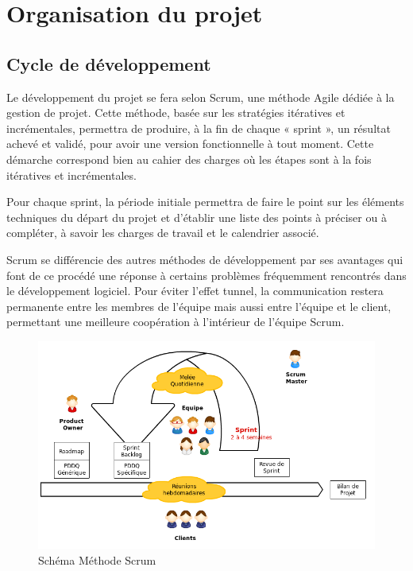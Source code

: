 \documentclass[10pt,a4paper]{article}
\begin{document}


\newpage
\section{Organisation du projet}
\label{sec:organisation}

\subsection{Cycle de développement}

Le développement du projet se fera selon Scrum, une méthode Agile dédiée à la gestion de projet. Cette méthode, basée sur les stratégies itératives et incrémentales, permettra de produire, à la fin de chaque « sprint », un résultat achevé et validé, pour avoir une version fonctionnelle à tout moment. Cette démarche correspond bien au cahier des charges où les étapes sont à la fois itératives et incrémentales.

Pour chaque sprint, la période initiale permettra de faire le point sur les éléments techniques du départ du projet et d'établir une liste des points à préciser ou à compléter, à savoir les charges de travail et le calendrier associé.

Scrum se différencie des autres méthodes de développement par ses avantages qui font de ce procédé une réponse à certains problèmes fréquemment rencontrés dans le développement logiciel. Pour éviter l’effet tunnel, la communication restera permanente entre les membres de l’équipe mais aussi entre l’équipe et le client, permettant une meilleure coopération à l’intérieur de l’équipe Scrum. 

\begin{figure}[!h]
  \centering
  \noindent\includegraphics[width=\textwidth]{scrum.png} 
  \caption{Schéma Méthode Scrum}
\end{figure}
\end{document}
